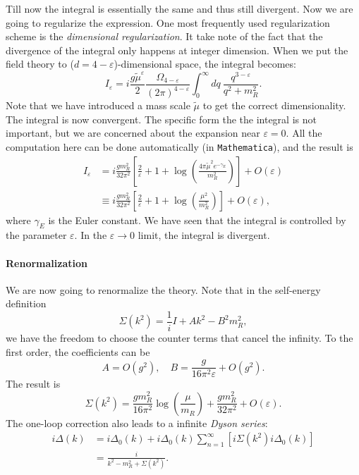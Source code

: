 \documentclass[aps,prb,superscriptaddress,nofootinbib]{revtex4}
\begin{document}
Till now the integral is essentially the same and thus still divergent.
Now we are going to regularize the expression.
One most frequently used regularization scheme is the \textit{dimensional regularization}.
It take note of the fact that the divergence of the integral only happens at integer dimension.
When we put the field theory to ($d=4-\varepsilon$)-dimensional space, the integral becomes:
\begin{equation}
	I_\varepsilon = i\frac{g\tilde{\mu}^\varepsilon}{2}\frac{\Omega_{4-\varepsilon}}{(2\pi)^{4-\varepsilon}} \int_0^\infty dq\ \frac{q^{3-\varepsilon}}{q^2+m_R^2}.
\end{equation}
Note that we have introduced a mass scale $\tilde\mu$ to get the correct dimensionality.
The integral is now convergent.
The specific form the the integral is not important, but we are concerned about the expansion near $\varepsilon = 0$. 
All the computation here can be done automatically (in \texttt{Mathematica}), and the result is
\begin{equation}
\begin{aligned}
	I_\varepsilon &= i\frac{g m_R^2}{32\pi^2} \left[\frac{2}{\varepsilon}+1+\log \left(\frac{4 \pi \tilde{\mu}^2 e^{-\gamma_E}}{m_R^2}\right)\right] + O(\varepsilon) \\
	&\equiv i\frac{g m_R^2}{32\pi^2} \left[\frac{2}{\varepsilon}+1+\log \left(\frac{\mu^2}{m_R^2}\right)\right] + O(\varepsilon),
\end{aligned}
\end{equation}
where $\gamma_E$ is the Euler constant. 
We have seen that the integral is controlled by the parameter $\varepsilon$.
In the $\varepsilon \rightarrow 0$ limit, the integral is divergent.


\paragraph*{Renormalization}
We are now going to renormalize the theory.
Note that in the self-energy definition
\begin{equation}
	\Sigma(k^2) = \frac{1}{i} I + A k^2-B^2 m_R^2,
\end{equation}
we have the freedom to choose the counter terms that cancel the infinity.
To the first order, the coefficients can be
\begin{equation}
	A = O(g^2), \quad
	B = \frac{g}{16\pi^2 \varepsilon} + O(g^2).
\end{equation}
The result is
\begin{equation}
	\Sigma(k^2) = \frac{g m_R^2}{16\pi^2} \log \left(\frac{\mu}{m_R}\right)
	+\frac{g m_R^2}{32\pi^2}+O(\varepsilon).
\end{equation}
The one-loop correction also leads to a infinite \textit{Dyson series}:
\begin{equation}
\begin{aligned}
	i\Delta(k) &= i\Delta_0(k) + i\Delta_0(k)\sum_{n=1}^\infty \left[i\Sigma(k^2)i\Delta_0(k)\right] \\
	&= \frac{i}{k^2 -m_R^2 + \Sigma(k^2)}.
\end{aligned}
\end{equation}
\end{document}
